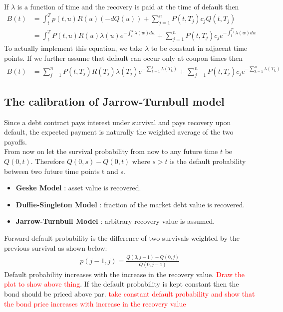 \par If $\lambda$ is a function of time and the recovery is paid at the time of default then
\begin{align*}
    B(t)&=\int_{t}^{T}{p(t,u)R(u)(-dQ(u))}+\sum_{j=1}^{n}{P(t,T_j)c_jQ(t,T_j)} \\
    &=\int_{t}^{T}{P(t,u)R(u)\lambda(u)e^{-\int_{t}^{u}{\lambda(w)dw}}}+\sum_{j=1}^{n}{P(t,T_j)c_je^{-\int_{t}^{T_j}{\lambda(w)dw}}}
\end{align*}
To actually implement this equation, we take $\lambda$ to be constant in adjacent time points.
If we further assume that default can occur only at coupon times then
\begin{align*}
    B(t)&=\sum_{j=1}^{n}{P(t,T_j)R(T_j)\lambda(T_j)e^{-\sum_{k=1}^{j}{\lambda(T_k)}}}+\sum_{j=1}^{n}{P(t,T_j)c_je^{-\sum_{k=1}^{n}{\lambda(T_k)}} }
\end{align*}

\subsection{The calibration of Jarrow-Turnbull model}
Since a debt contract pays interest under survival and pays recovery upon default, the expected payment is naturally the weighted average of the two payoffs. \\
From now on let the survival probability from now to any future time $t$ be $Q(0,t)$.
Therefore $Q(0,s)-Q(0,t)$ where $s>t$ is the default probability between two future time points t and s.
\begin{itemize}
    \item \textbf{Geske Model} : asset value is recovered.
    \item \textbf{Duffie-Singleton Model} : fraction of the market debt value is recovered.
    \item \textbf{Jarrow-Turnbull Model} : arbitrary recovery value is assumed.
\end{itemize}
Forward default probability is the difference of two survivals weighted by the previous survival as shown below:
\begin{align*}
    p(j-1,j)=\frac{Q(0,j-1)-Q(0,j)}{Q(0,j-1)} \label{eq:forwarddefaultProb}
\end{align*}
Default probability increases with the increase in the recovery value.
\textcolor{red}{Draw the plot to show above thing}. If the default probability is kept constant then the bond should be priced above par.
\textcolor{red}{take constant default probability and show that the bond price increases with increase in the recovery value}
